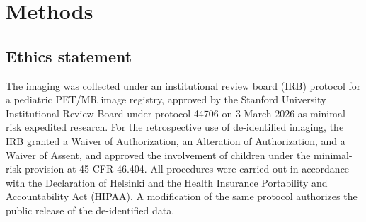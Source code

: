 
\section*{Methods}\label{sec:methods}

\subsection*{Ethics statement}\label{subsec:ethics}
The imaging was collected under an institutional review board (IRB) protocol for a pediatric PET/MR image registry, approved by the Stanford University Institutional Review Board under protocol 44706 on 3 March 2026 as minimal-risk expedited research.
For the retrospective use of de-identified imaging, the IRB granted a Waiver of Authorization, an Alteration of Authorization, and a Waiver of Assent, and approved the involvement of children under the minimal-risk provision at 45 CFR 46.404.
All procedures were carried out in accordance with the Declaration of Helsinki and the Health Insurance Portability and Accountability Act (HIPAA).
A modification of the same protocol authorizes the public release of the de-identified data.

